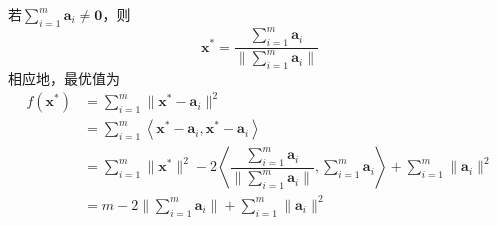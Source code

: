 \begin{example}
\begin{solution}
        若$\sum\limits_{i = 1}^{m}\boldsymbol{a}_i \neq \boldsymbol{0}$，则
        \[
            \boldsymbol{x}^*=\dfrac{\sum_{i=1}^m\boldsymbol{a}_i}{\|\sum_{i=1}^m\boldsymbol{a}_i\|}
        \]
        相应地，最优值为
        \[
            \begin{aligned}
                f(\boldsymbol{x}^*) &= \sum_{i=1}^{m}\|\boldsymbol{x}^*-\boldsymbol{a}_{i}\|^{2} \\
                & = \sum_{i=1}^{m}\left< \boldsymbol{x}^*-\boldsymbol{a}_{i},\boldsymbol{x}^*-\boldsymbol{a}_{i} \right>\\
                & =\sum_{i=1}^{m}\|\boldsymbol{x}^*\|^2-2\left<\dfrac{\sum_{i=1}^m\boldsymbol{a}_i}{{\|\sum_{i=1}^m\boldsymbol{a}_i\|}},\sum_{i=1}^m\boldsymbol{a}_i\right>+\sum_{i=1}^m\|\boldsymbol{a}_i\|^2\\
                &=m-2\|\sum_{i=1}^m\boldsymbol{a}_i\|+\sum_{i=1}^m\|\boldsymbol{a}_i\|^2
            \end{aligned}
        \]
    \end{solution}
\end{example}
